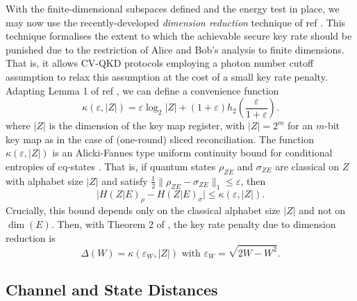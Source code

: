 ﻿\documentclass[12pt]{article}
\begin{document}
With the finite-dimensional subspaces defined and the energy test in place, we may now use the recently-developed \textit{dimension reduction} technique of ref \cite{Upadhyaya-2021}. This technique formalises the extent to which the achievable secure key rate should be punished due to the restriction of Alice and Bob's analysis to finite dimensions. That is, it allows CV-QKD protocols employing a photon number cutoff assumption to relax this assumption at the cost of a small key rate penalty. Adapting Lemma 1 of ref \cite{Upadhyaya-2021}, we can define a convenience function
\begin{equation}
  \label{eq: kappa}
  \kappa(\varepsilon, |Z|) = \varepsilon \log_2 |Z| + (1 + \varepsilon) h_2\left(\frac{\varepsilon}{1 + \varepsilon}\right).
\end{equation}
where $|Z|$ is the dimension of the key map register, with $|Z| = 2^m$ for an $m$-bit key map as in the case of (one-round) sliced reconciliation. The function $\kappa(\varepsilon,|Z|)$ is an Alicki-Fannes type uniform continuity bound for conditional entropies of cq-states \cite{Winter-2016}. That is, if quantum states $\rho_{ZE}$ and $\sigma_{ZE}$ are classical on $Z$ with alphabet size $|Z|$ and satisfy $\tfrac12\|\rho_{ZE}-\sigma_{ZE}\|_1\le \varepsilon$, then \cite{Winter-2016}
\begin{equation}
\big|H(Z|E)_\rho - H(Z|E)_\sigma\big| \le \kappa(\varepsilon,|Z|).
\end{equation}
Crucially, this bound depends only on the classical alphabet size $|Z|$ and not on $\dim(E)$. Then, with Theorem 2 of \cite{Upadhyaya-2021}, the key rate penalty due to dimension reduction is
\begin{equation}
  \label{eq: dimension reduction penalty}
  \Delta(W) = \kappa(\varepsilon_W, |Z|) \text{ with } \varepsilon_W = \sqrt{2W - W^2}.
\end{equation}

\subsection{Channel and State Distances}
\label{subsec: channel and state distances}
\end{document}
